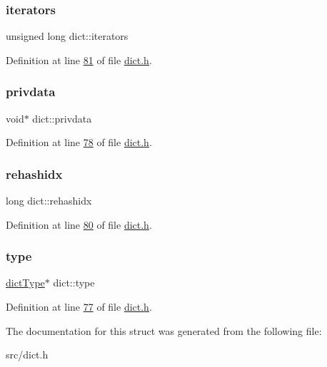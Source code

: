 \mbox{\label{structdict_a936aefce2677e310e5ecb5943558d614}} 
\subsubsection{\texorpdfstring{iterators}{iterators}}
{\footnotesize\ttfamily unsigned long dict\+::iterators}



Definition at line \hyperlink{dict_8h_source_l00081}{81} of file \hyperlink{dict_8h_source}{dict.\+h}.

\mbox{\label{structdict_a36ce9f4e7d035fa4d7d2886f30b6a9af}} 
\subsubsection{\texorpdfstring{privdata}{privdata}}
{\footnotesize\ttfamily void$\ast$ dict\+::privdata}



Definition at line \hyperlink{dict_8h_source_l00078}{78} of file \hyperlink{dict_8h_source}{dict.\+h}.

\mbox{\label{structdict_aa6aeb098acd50b590319317ad8811b58}} 
\subsubsection{\texorpdfstring{rehashidx}{rehashidx}}
{\footnotesize\ttfamily long dict\+::rehashidx}



Definition at line \hyperlink{dict_8h_source_l00080}{80} of file \hyperlink{dict_8h_source}{dict.\+h}.

\mbox{\label{structdict_a89da3d5d54bd930937587a3c411af5fd}} 
\subsubsection{\texorpdfstring{type}{type}}
{\footnotesize\ttfamily \hyperlink{structdictType}{dict\+Type}$\ast$ dict\+::type}



Definition at line \hyperlink{dict_8h_source_l00077}{77} of file \hyperlink{dict_8h_source}{dict.\+h}.



The documentation for this struct was generated from the following file\+:\begin{DoxyCompactItemize}
\item 
src/dict.\+h\end{DoxyCompactItemize}
